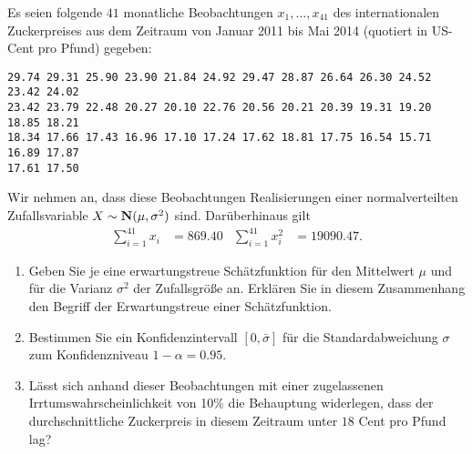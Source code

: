Es seien folgende $41$ monatliche Beobachtungen $x_{1},\dots ,x_{41}$ des internationalen
Zuckerpreises aus dem Zeitraum von Januar 2011 bis Mai 2014 (quotiert in US-Cent
pro Pfund) gegeben:
\begin{lstlisting}
29.74 29.31 25.90 23.90 21.84 24.92 29.47 28.87 26.64 26.30 24.52 23.42 24.02
23.42 23.79 22.48 20.27 20.10 22.76 20.56 20.21 20.39 19.31 19.20 18.85 18.21
18.34 17.66 17.43 16.96 17.10 17.24 17.62 18.81 17.75 16.54 15.71 16.89 17.87
17.61 17.50
\end{lstlisting}
Wir nehmen an, dass diese Beobachtungen Realisierungen einer normalverteilten Zufallsvariable
$X \sim \mathbf{N}(\mu, \sigma^{2})$ sind. Darüberhinaus gilt
\begin{align*}
    \sum_{i=1}^{41} x_{i} &= 869.40 & \sum_{i=1}^{41} x_{i}^{2} &= 19090.47.
\end{align*}
\begin{enumerate}
    \item Geben Sie je eine erwartungstreue Schätzfunktion für den Mittelwert
        $\mu$ und für die Varianz $\sigma^2$ der Zufallsgr\"o{\ss}e an.
        Erkl\"aren Sie in diesem Zusammenhang den Begriff der Erwartungstreue
        einer Sch\"atzfunktion.

    \item Bestimmen Sie ein Konfidenzintervall $[0,\bar \sigma]$ für die
        Standardabweichung $\sigma$ zum Konfidenzniveau $1-\alpha = 0.95$.

    \item Lässt sich anhand dieser Beobachtungen mit einer zugelassenen
        Irrtumswahrscheinlichkeit von 10\% die Behauptung widerlegen, dass
        der durchschnittliche Zuckerpreis in diesem Zeitraum unter $18$ Cent
        pro Pfund lag?
\end{enumerate}

